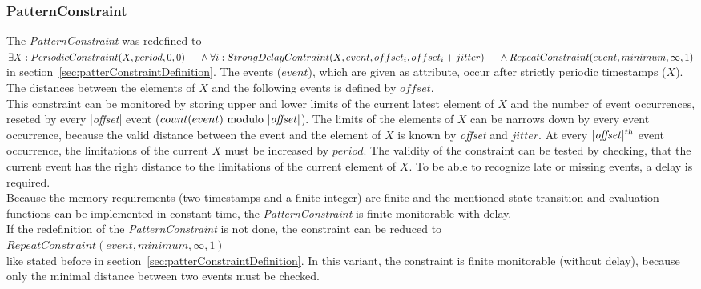 \subsubsection{PatternConstraint}
	The \emph{PatternConstraint} was redefined to\\[10pt]
	\begin{math}
		\exists X: PeriodicConstraint(X, period, 0, 0)\\
		\text{\hspace{.5cm}} \land \forall i: StrongDelayContraint(X, event, offset_i, offset_i+jitter)\\
		\text{\hspace{.5cm}} \land RepeatConstraint(event, minimum, \infty, 1)
	\end{math}\\[10pt]
	in section~\ref{sec:patterConstraintDefinition}. The events ($event$), which are given as attribute, occur after strictly periodic timestamps ($X$). The distances between the elements of $X$ and the following events is defined by $offset$.\\
	This constraint can be monitored by storing upper and lower limits of the current latest element of $X$ and the number of event occurrences, reseted by every |\emph{offset}| event ($count(event)\text{ modulo |\emph{offset}}|$). The limits of the elements of $X$ can be narrows down by every event occurrence, because the valid distance between the event and the element of $X$ is known by \emph{offset} and $jitter$. At every $|\text{\emph{offset}}|^{th}$ event occurrence, the limitations of the current $X$ must be increased by $period$. The validity of the constraint can be tested by checking, that the current event has the right distance to the limitations of the current element of $X$. To be able to recognize late or missing events, a delay is required.\\
	Because the memory requirements (two timestamps and a finite integer) are finite and the mentioned state transition and evaluation functions can be implemented in constant time, the \emph{PatternConstraint} is finite monitorable with delay.\\[10 pt]
	If the redefinition of the \emph{PatternConstraint} is not done, the constraint can be reduced to\\[10pt]
	\begin{math}
		RepeatConstraint(event, minimum, \infty, 1)
	\end{math}\\[10pt]
	like stated before in section~\ref{sec:patterConstraintDefinition}. In this variant, the constraint is finite monitorable (without delay), because only the minimal distance between two events must be checked.
	
